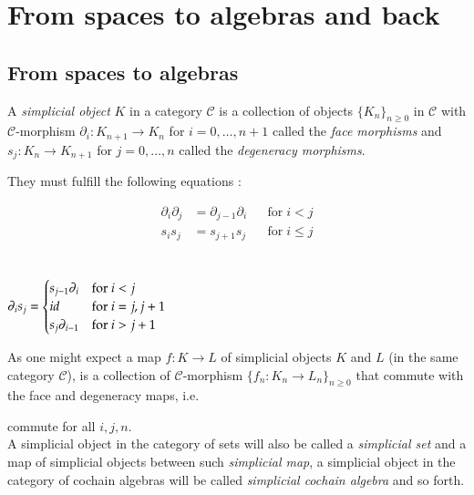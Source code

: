 
 \section{From spaces to algebras and back} 
 \subsection{From spaces to algebras} \label{sec:FromSpacesToAlgebras}
 
 \begin{Definition}
  A \emph{simplicial object} $K$ in a category $\mathscr{C}$
  is a collection of objects ${\lbrace K_n \rbrace}_{n \geq 0}$ in $\mathscr{C}$ with $\mathscr{C}$-morphism
  $\partial_i \colon K_{n+1} \to K_n$ for $i = 0, \ldots, n+1$ called the \emph{face morphisms} and \newline
  $s_j \colon K_n \to K_{n+1}$ for $j = 0, \ldots, n$ called the \emph{degeneracy morphisms}.
  
  They must fulfill the following equations : 
%     
    \begin{multicols}{2}
     \begin{align*}
      \partial_i \partial_j &= \partial_{j-1} \partial_i & & \text{for} \; i < j \\
      s_i s_j &= s_{j+1} s_j & & \text{for} \; i \leq j
     \end{align*}
\columnbreak
\\ \\
      $\partial_i s_j = \begin{cases}
              s_{j-1} \partial_i 	&\text{for $i < j$} \\
              id 	&\text{for $i = j, j+1$} \\
              s_j \partial_{i-1}	 &\text{for $ i > j + 1$}
             
             \end{cases}
	      $
  \end{multicols}

    As one might expect a map $f \colon K \to L$ of simplicial objects $K$ and $L$ (in the same category $\mathscr{C}$), is a collection
    of $\mathscr{C}$-morphism ${\lbrace f_n \colon K_n \to L_n\rbrace }_{ n \geq 0}$ that commute with the face and degeneracy maps, i.e.\
    
  \centerline{
  }  
    
    commute for all $i,j,n$. \\
   A simplicial object in the category of sets will also be called a \emph{simplicial set} and a map 
   of simplicial objects between such \emph{simplicial map}, a simplicial object in the category of 
   cochain algebras will be called \emph{simplicial cochain algebra} and so forth.
  
 \end{Definition}

